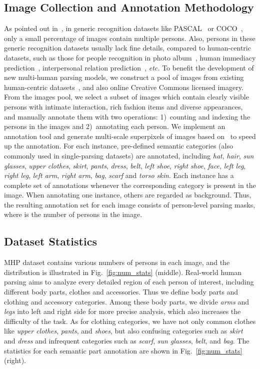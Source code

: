 \documentclass[10pt, letterpaper]{article}
\begin{document}
\subsection{Image Collection and Annotation Methodology}
As pointed out in~\cite{jiang2017detangling}, in generic recognition datasets like PASCAL~\cite{everingham2015pascal} or COCO~\cite{lin2014microsoft}, only a small percentage of images contain multiple persons. Also, persons in these generic recognition datasets usually lack fine details, compared to human-centric datasets, such as those for people recognition in photo album~\cite{piper}, human immediacy prediction~\cite{chu2015multi}, interpersonal relation prediction~\cite{SOCIALRELATION_2017}, \emph{etc.} To benefit the development of new multi-human parsing models, we construct a pool of images from existing human-centric datasets~\cite{modec13,chu2015multi,SOCIALRELATION_2017,piper}, and also online Creative Commons licensed imagery. From the images pool, we select a subset of images which contain clearly visible persons with intimate interaction, rich fashion items and diverse appearances, and manually annotate them with two operations: 1)~counting and indexing the persons in the images and 2)~annotating each person. We implement an annotation tool and generate multi-scale superpixels of images based on~\cite{arbelaez2011contour} to speed up the annotation. For each instance,  pre-defined semantic categories (also commonly used in  single-parsing datasets) are annotated, including \emph{hat},  \emph{hair}, \emph{sun glasses}, \emph{upper clothes}, \emph{skirt}, \emph{pants}, \emph{dress}, \emph{belt}, \emph{left shoe}, \emph{right shoe}, \emph{face}, \emph{left leg}, \emph{right leg}, \emph{left arm}, \emph{right arm}, \emph{bag}, \emph{scarf} and \emph{torso skin}. Each instance has a complete set of annotations whenever the corresponding category is present in the image. When annotating one instance, others are regarded as background. Thus, the resulting annotation set for each image consists of  person-level parsing masks, where  is the number of persons in the image.

\subsection{Dataset Statistics}
MHP dataset contains various numbers of persons in each image, and the distribution is illustrated in Fig.~\ref{fig:num_stats} (middle). Real-world human parsing aims to analyze every detailed region of each person of interest, including different body parts, clothes and accessories. Thus we define  body parts and  clothing and accessory categories. Among these  body parts, we divide \emph{arms} and \emph{legs} into left and right side for more precise analysis, which also increases the difficulty of the task. As for clothing categories, we have not only common clothes like \emph{upper clothes}, \emph{pants}, and \emph{shoes}, but also confusing categories such as \emph{skirt} and \emph{dress} and infrequent categories such as \emph{scarf},  \emph{sun glasses}, \emph{belt}, and \emph{bag}. The statistics for each semantic part annotation are shown in Fig.~\ref{fig:num_stats} (right).
\end{document}

